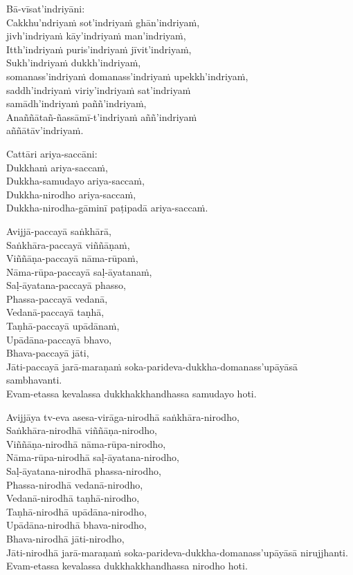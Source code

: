 Bā-vīsat'indriyāni:\\
Cakkhu'ndriyaṁ sot'indriyaṁ ghān'indriyaṁ,\\
jivh'indriyaṁ kāy'indriyaṁ man'indriyaṁ,\\
Itth'indriyaṁ puris'indriyaṁ jīvit'indriyaṁ,\\
Sukh'indriyaṁ dukkh'indriyaṁ,\\
somanass'indriyaṁ domanass'indriyaṁ upekkh'indriyaṁ,\\
saddh'indriyaṁ viriy'indriyaṁ sat'indriyaṁ\\
samādh'indriyaṁ paññ'indriyaṁ,\\
Anaññātañ-ñassāmī-t'indriyaṁ aññ'indriyaṁ\\
aññātāv'indriyaṁ.

Cattāri ariya-saccāni:\\
Dukkhaṁ ariya-saccaṁ,\\
Dukkha-samudayo ariya-saccaṁ,\\
Dukkha-nirodho ariya-saccaṁ,\\
Dukkha-nirodha-gāminī paṭipadā ariya-saccaṁ.

Avijjā-paccayā saṅkhārā,\\
Saṅkhāra-paccayā viññāṇaṁ,\\
Viññāṇa-paccayā nāma-rūpaṁ,\\
Nāma-rūpa-paccayā saḷ-āyatanaṁ,\\
Saḷ-āyatana-paccayā phasso,\\
Phassa-paccayā vedanā,\\
Vedanā-paccayā taṇhā,\\
Taṇhā-paccayā upādānaṁ,\\
Upādāna-paccayā bhavo,\\
Bhava-paccayā jāti,\\
Jāti-paccayā jarā-maraṇaṁ soka-parideva-dukkha-domanass'upāyāsā sambhavanti.\\
Evam-etassa kevalassa dukkhakkhandhassa samudayo hoti.

Avijjāya tv-eva asesa-virāga-nirodhā saṅkhāra-nirodho,\\
Saṅkhāra-nirodhā viññāṇa-nirodho,\\
Viññāṇa-nirodhā nāma-rūpa-nirodho,\\
Nāma-rūpa-nirodhā saḷ-āyatana-nirodho,\\
Saḷ-āyatana-nirodhā phassa-nirodho,\\
Phassa-nirodhā vedanā-nirodho,\\
Vedanā-nirodhā taṇhā-nirodho,\\
Taṇhā-nirodhā upādāna-nirodho,\\
Upādāna-nirodhā bhava-nirodho,\\
Bhava-nirodhā jāti-nirodho,\\
Jāti-nirodhā jarā-maraṇaṁ soka-parideva-dukkha-domanass'upāyāsā nirujjhanti.\\
Evam-etassa kevalassa dukkhakkhandhassa nirodho hoti.

